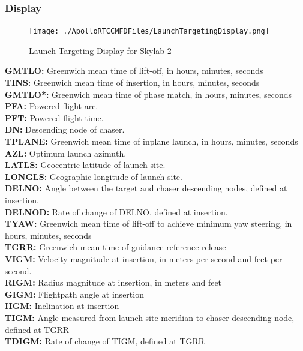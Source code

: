 \documentclass[11pt]{article} %
\begin{document}
\newpage
\subsubsection{Display}

\begin{figure}[hp]
	\centering
		\texttt{[image: ./ApolloRTCCMFDFiles/LaunchTargetingDisplay.png]}
	\caption{Launch Targeting Display for Skylab 2}
	\label{fig:LaunchTargetingDisplayExample1}
\end{figure}

\textbf{GMTLO:} Greenwich mean time of lift-off, in hours, minutes, seconds\\
\textbf{TINS:} Greenwich mean time of insertion, in hours, minutes, seconds\\
\textbf{GMTLO*:} Greenwich mean time of phase match, in hours, minutes, seconds\\
\textbf{PFA:} Powered flight arc.\\
\textbf{PFT:} Powered flight time.\\
\textbf{DN:} Descending node of chaser.\\
\textbf{TPLANE:} Greenwich mean time of inplane launch, in hours, minutes, seconds\\
\textbf{AZL:} Optimum launch azimuth.\\
\textbf{LATLS:} Geocentric latitude of launch site.\\
\textbf{LONGLS:} Geographic longitude of launch site.\\
\textbf{DELNO:} Angle between the target and chaser descending nodes, defined at insertion.\\
\textbf{DELNOD:} Rate of change of DELNO, defined at insertion.\\
\textbf{TYAW:} Greenwich mean time of lift-off to achieve minimum yaw steering, in hours, minutes, seconds\\
\textbf{TGRR:} Greenwich mean time of guidance reference release\\
\textbf{VIGM:} Velocity magnitude at insertion, in meters per second and feet per second.\\
\textbf{RIGM:} Radius magnitude at insertion, in meters and feet\\
\textbf{GIGM:} Flightpath angle at insertion\\
\textbf{IIGM:} Inclination at insertion\\
\textbf{TIGM:} Angle measured from launch site meridian to chaser descending node, defined at TGRR\\
\textbf{TDIGM:} Rate of change of TIGM, defined at TGRR\\
\end{document}
